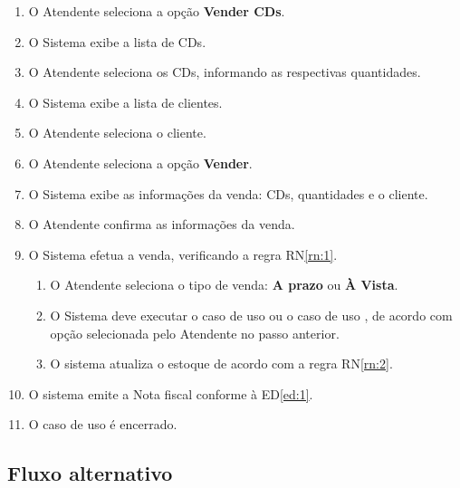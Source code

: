 \begin{enumerate}	
	\item O Atendente seleciona a opção \textbf{Vender CDs}.
	\item O Sistema exibe a lista de CDs. \label{fluxo_basico:2}
	\item O Atendente seleciona os CDs, informando as respectivas quantidades.
	\item O Sistema exibe a lista de clientes. \label{fluxo_basico:4}
	\item O Atendente seleciona o cliente.
	\item O Atendente seleciona a opção \textbf{Vender}.
	\item O Sistema exibe as informações da venda: CDs, quantidades e o cliente.
	\item O Atendente confirma as informações da venda. \label{fluxo_basico:8}
	\item O Sistema efetua a venda, verificando a regra RN\ref{rn:1}. \label{fluxo_basico:9}
	\begin{enumerate}
		\item O Atendente seleciona o tipo de venda: \textbf{A prazo} ou \textbf{À Vista}.
		\item O Sistema deve executar o caso de uso  ou o caso de uso , de acordo com opção selecionada pelo Atendente no passo anterior.
		\item O sistema atualiza o estoque de acordo com a regra RN\ref{rn:2}. 
	\end{enumerate}
	\item O sistema emite a Nota fiscal conforme à ED\ref{ed:1}.
	\item O caso de uso é encerrado.  
\end{enumerate}

\subsection{Fluxo alternativo}

